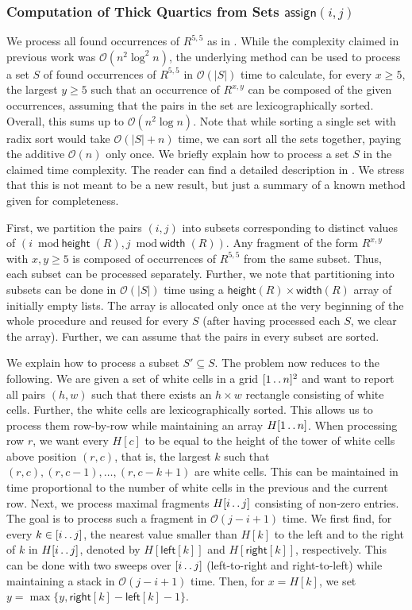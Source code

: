 \documentclass[11pt,letterpaper]{article}
\newcommand{\cO}{\mathcal{O}}
\newcommand{\width}{\textsf{width}}
\newcommand{\height}{\textsf{height}}
\def\dd{\mathinner{.\,.}}
\newcommand{\assign}{\textsf{assign}}
\begin{document}
\subsubsection{Computation of Thick Quartics from Sets $\assign(i,j)$}
We process all found occurrences of $R^{5,5}$ as in \cite[Section 5]{CRRWZ}. While the complexity claimed
in previous work was $\cO(n^{2}\log^2 n)$, the underlying method can be used to process a set $S$ of found
occurrences of $R^{5,5}$ in $\cO(|S|)$ time to calculate, for every $x\geq 5$, the largest $y\geq 5$
such that an occurrence of $R^{x,y}$ can be composed of the given occurrences,
assuming that the pairs in the set are lexicographically sorted.
Overall, this sums up to $\cO(n^{2}\log n)$.
Note that while sorting a single set with radix sort would take $\cO(|S|+n)$ time, we can sort all the sets
together, paying the additive $\cO(n)$ only once.
We briefly explain how to process a set $S$ in the claimed time complexity. The reader can find a detailed
description in \cite[Section 5]{CRRWZ}. We stress that this is not meant to be a new result, but just
a summary of a known method given for completeness.

First, we partition the pairs $(i,j)$ into subsets corresponding to distinct values of $(i\bmod \height(R),j\bmod \width(R))$. Any fragment
of the form $R^{x,y}$ with $x,y\geq 5$ is composed of occurrences of $R^{5,5}$ from the same subset.
Thus, each subset can be processed separately. Further, we note that partitioning into subsets can be done
in $\cO(|S|)$ time using a $\height(R)\times \width(R)$ array of initially empty lists. The array is allocated only
once at the very beginning of the whole procedure and reused for every $S$ (after having processed each $S$, we clear the array).
Further, we can assume that the pairs in every subset are sorted.

We explain how to process a subset $S'\subseteq S$. The problem now reduces to the following.
We are given a set of white cells in a grid $[1 \dd n]^{2}$ and want to report all pairs $(h,w)$ such that
there exists an $h\times w$ rectangle consisting of white cells. Further, the white cells are lexicographically
sorted. This allows us to process them row-by-row while maintaining an array $H[1\dd n]$. When processing
row $r$, we want every $H[c]$ to be equal to the height of the tower of white cells above position $(r,c)$,
that is, the largest $k$ such that $(r,c),(r,c-1),\ldots,(r,c-k+1)$ are white cells. This can be maintained
in time proportional to the number of white cells in the previous and the current row.
Next, we process maximal fragments $H[i\dd j]$ consisting of non-zero entries. The goal is to process such
a fragment in $\cO(j-i+1)$ time. We first find, for every $k\in [i\dd j]$, the nearest value smaller than $H[k]$ to the left
and to the right of $k$ in $H[i\dd j]$, denoted by $H[\textsf{left}[k]]$ and $H[\textsf{right}[k]]$, respectively.
This can be done with two sweeps over $[i \dd j]$ (left-to-right and right-to-left)
while maintaining a stack in $\cO(j-i+1)$ time. Then, for $x=H[k]$, we set $y=\max\{y, \textsf{right}[k]-\textsf{left}[k]-1\}$.



\end{document}
